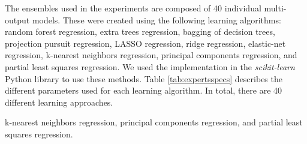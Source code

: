 \documentclass[smallcondensed]{svjour3}
\begin{document}
The ensembles used in the experiments are composed of 40 individual multi-output models. These were created using the following learning algorithms:  random forest regression, extra trees regression, bagging of decision trees, projection pursuit regression, LASSO regression, ridge regression, elastic-net regression, k-nearest neighbors regression, principal components regression, and partial least squares regression. We used the implementation in the \textit{scikit-learn} \cite{pedregosa2011scikit} Python library to use these methods. Table \ref{tab:expertsspecs} describes the different parameters used for each learning algorithm. In total, there are 40 different learning approaches.

k-nearest neighbors regression, principal components regression, and partial least squares regression.
\end{document}
